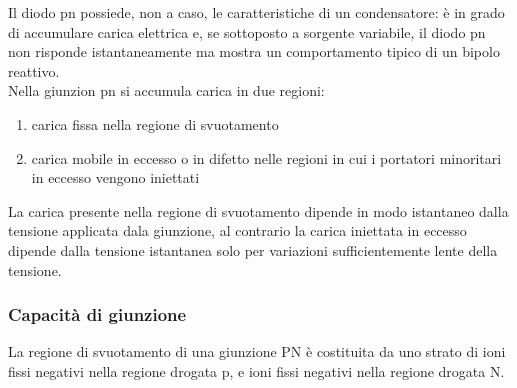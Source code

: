 Il diodo pn possiede, non a caso, le caratteristiche di un condensatore: è in grado di accumulare carica elettrica e, se sottoposto a sorgente variabile, il diodo pn non risponde istantaneamente ma mostra un comportamento tipico di un bipolo reattivo.\\
Nella giunzion pn si accumula carica in due regioni:
\begin{enumerate}
    \item carica fissa nella regione di svuotamento
    \item carica mobile in eccesso o in difetto nelle regioni in cui i portatori minoritari in eccesso vengono iniettati
\end{enumerate}
La carica presente nella regione di svuotamento dipende in modo istantaneo dalla tensione applicata dala giunzione, al contrario la carica iniettata in eccesso dipende dalla tensione istantanea solo per variazioni sufficientemente lente della tensione.
\cleardoublepage%

\subsubsection*{Capacità di giunzione}
La regione di svuotamento di una giunzione PN è costituita da uno strato di ioni fissi negativi nella regione drogata p, e ioni fissi negativi nella regione drogata N.
\begin{center}
\end{center}

